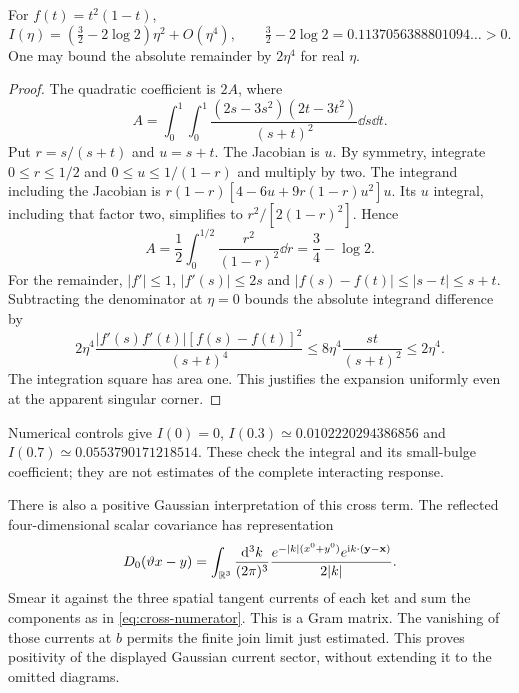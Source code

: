 \begin{proposition}\label{prop:bulge-coefficient}
For $f(t)=t^2(1-t)$,
\begin{equation}\label{eq:bulge-coefficient}
 I(\eta)=(\tfrac32-2\log2)\eta^2+O(\eta^4),\qquad
 \tfrac32-2\log2=0.1137056388801094\ldots>0.
\end{equation}
One may bound the absolute remainder by $2\eta^4$ for real $\eta$.
\end{proposition}
\begin{proof}
The quadratic coefficient is $2A$, where
\begin{equation}
 A=\int_0^1\!\int_0^1
 \frac{(2s-3s^2)(2t-3t^2)}{(s+t)^2}\dd s\dd t.
\end{equation}
Put $r=s/(s+t)$ and $u=s+t$. The Jacobian is $u$.
By symmetry, integrate $0\leq r\leq1/2$ and
$0\leq u\leq1/(1-r)$ and multiply by two. The integrand including
the Jacobian is
$r(1-r)[4-6u+9r(1-r)u^2]u$.
Its $u$ integral, including that factor two, simplifies to
$r^2/[2(1-r)^2]$. Hence
\begin{equation}
 A=\frac12\int_0^{1/2}\frac{r^2}{(1-r)^2}\dd r
 =\frac34-\log2.
\end{equation}
For the remainder, $|f'|\leq1$, $|f'(s)|\leq2s$ and
$|f(s)-f(t)|\leq|s-t|\leq s+t$. Subtracting the denominator at
$\eta=0$ bounds the absolute integrand difference by
\begin{equation}
 2\eta^4\frac{|f'(s)f'(t)|[f(s)-f(t)]^2}{(s+t)^4}
 \leq8\eta^4\frac{st}{(s+t)^2}\leq2\eta^4.
\end{equation}
The integration square has area one. This justifies the expansion
uniformly even at the apparent singular corner.
\end{proof}

Numerical controls give $I(0)=0$,
$I(0.3)\simeq0.0102220294386856$ and
$I(0.7)\simeq0.0553790171218514$. These check the integral and its
small-bulge coefficient; they are not estimates of the complete
interacting response.

There is also a positive Gaussian interpretation of this cross term.
The reflected four-dimensional scalar covariance has representation
\begin{equation}
 D_0(\vartheta x-y)=\int_{\mathbb R^3}\frac{\mathrm d^3k}{(2\pi)^3}
 \frac{e^{-|k|(x^0+y^0)}e^{\mathrm i k\cdot(\mathbf y-\mathbf x)}}{2|k|}.
\end{equation}
Smear it against the three spatial tangent currents of each ket and
sum the components as in \eqref{eq:cross-numerator}. This is a Gram
matrix. The vanishing of those currents at $b$ permits the finite
join limit just estimated. This proves positivity of the displayed
Gaussian current sector, without extending it to the omitted diagrams.

